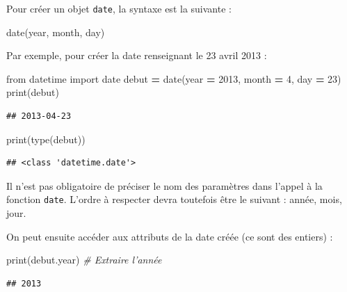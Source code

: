 \documentclass[12pt,]{book}
\newenvironment{Shaded}{\begin{snugshade}}{\end{snugshade}}
\newcommand{\DecValTok}[1]{\textcolor[rgb]{0.00,0.00,0.81}{#1}}
\newcommand{\ImportTok}[1]{#1}
\newcommand{\CommentTok}[1]{\textcolor[rgb]{0.56,0.35,0.01}{\textit{#1}}}
\newcommand{\OperatorTok}[1]{\textcolor[rgb]{0.81,0.36,0.00}{\textbf{#1}}}
\newcommand{\BuiltInTok}[1]{#1}
\newcommand{\NormalTok}[1]{#1}
\numberwithin{equation}{section}
\numberwithin{countremarque}{section}
\let\BeginKnitrBlock\begin \let\EndKnitrBlock\end
\begin{document}
Pour créer un objet \texttt{date}, la syntaxe est la suivante :

\begin{Shaded}
\begin{Highlighting}[]
\NormalTok{date(year, month, day)}
\end{Highlighting}
\end{Shaded}

Par exemple, pour créer la date renseignant le 23 avril 2013 :

\begin{Shaded}
\begin{Highlighting}[]
\ImportTok{from}\NormalTok{ datetime }\ImportTok{import}\NormalTok{ date}
\NormalTok{debut }\OperatorTok{=}\NormalTok{ date(year }\OperatorTok{=} \DecValTok{2013}\NormalTok{, month }\OperatorTok{=} \DecValTok{4}\NormalTok{, day }\OperatorTok{=} \DecValTok{23}\NormalTok{)}
\BuiltInTok{print}\NormalTok{(debut)}
\end{Highlighting}
\end{Shaded}

\begin{lstlisting}
## 2013-04-23
\end{lstlisting}

\begin{Shaded}
\begin{Highlighting}[]
\BuiltInTok{print}\NormalTok{(}\BuiltInTok{type}\NormalTok{(debut))}
\end{Highlighting}
\end{Shaded}

\begin{lstlisting}
## <class 'datetime.date'>
\end{lstlisting}

\BeginKnitrBlock{remarque}
Il n'est pas obligatoire de préciser le nom des paramètres dans l'appel
à la fonction \texttt{date}. L'ordre à respecter devra toutefois être le
suivant : année, mois, jour.
\EndKnitrBlock{remarque}

On peut ensuite accéder aux attributs de la date créée (ce sont des
entiers) :

\begin{Shaded}
\begin{Highlighting}[]
\BuiltInTok{print}\NormalTok{(debut.year) }\CommentTok{# Extraire l'année}
\end{Highlighting}
\end{Shaded}

\begin{lstlisting}
## 2013
\end{lstlisting}
\end{document}
